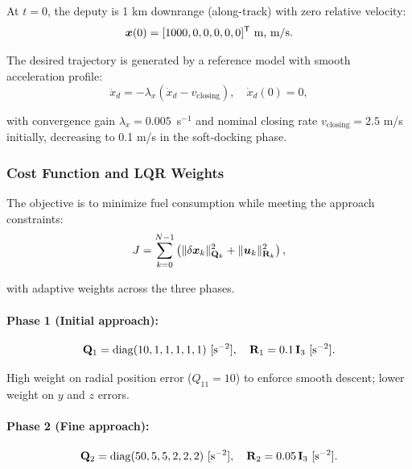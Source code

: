 At $t=0$, the deputy is 1 km downrange (along-track) with zero relative velocity:
\begin{equation}
\bm{x}(0) = [1000, 0, 0, 0, 0, 0]^{\mathsf{T}}~\text{m, m/s}.
\label{eq:ch8:x0-docking}
\end{equation}

The desired trajectory is generated by a reference model with smooth acceleration profile:
\begin{equation}
\ddot{x}_d = -\lambda_x(\dot{x}_d - v_{\text{closing}}), \quad \dot{x}_d(0) = 0,
\end{equation}

with convergence gain $\lambda_x = 0.005$~s$^{-1}$ and nominal closing rate $v_{\text{closing}} = 2.5$ m/s
initially, decreasing to 0.1 m/s in the soft-docking phase.

\subsubsection{Cost Function and LQR Weights}

The objective is to minimize fuel consumption while meeting the approach constraints:
\begin{equation}
J = \sum_{k=0}^{N-1}\left(\|\delta\bm{x}_k\|_{\mathbf{Q}_k}^2 + \|\bm{u}_k\|_{\mathbf{R}_k}^2\right),
\label{eq:ch8:lqr-cost-docking}
\end{equation}

with adaptive weights across the three phases.

\paragraph{Phase 1 (Initial approach):}
\begin{equation}
\mathbf{Q}_1 = \operatorname{diag}(10, 1, 1, 1, 1, 1)~[\text{s}^{-2}], \quad \mathbf{R}_1 = 0.1\,\mathbf{I}_3~[\text{s}^{-2}].
\label{eq:ch8:Q1-R1}
\end{equation}

High weight on radial position error ($Q_{11} = 10$) to enforce smooth descent; lower weight
on $y$ and $z$ errors.

\paragraph{Phase 2 (Fine approach):}
\begin{equation}
\mathbf{Q}_2 = \operatorname{diag}(50, 5, 5, 2, 2, 2)~[\text{s}^{-2}], \quad \mathbf{R}_2 = 0.05\,\mathbf{I}_3~[\text{s}^{-2}].
\label{eq:ch8:Q2-R2}
\end{equation}

